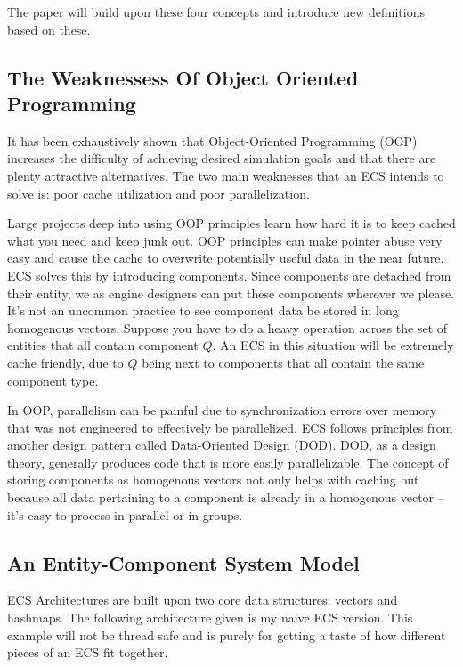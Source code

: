 \noindent The paper will build upon these four concepts and introduce new definitions based on these.

\subsection{The Weaknessess Of Object Oriented Programming}

It has been exhaustively shown that Object-Oriented Programming (OOP) increases the difficulty of achieving desired simulation goals and that there are plenty attractive alternatives. The two main weaknesses that an ECS intends to solve is: poor cache utilization and poor parallelization.

Large projects deep into using OOP principles learn how hard it is to keep cached what you need and keep junk out. OOP principles can make pointer abuse very easy and cause the cache to overwrite potentially useful data in the near future. ECS solves this by introducing components. Since components are detached from their entity, we as engine designers can put these components wherever we please. It's not an uncommon practice to see component data be stored in long homogenous vectors. Suppose you have to do a heavy operation across the set of entities that all contain component $Q$. An ECS in this situation will be extremely cache friendly, due to $Q$ being next to components that all contain the same component type.

In OOP, parallelism can be painful due to synchronization errors over memory that was not engineered to effectively be parallelized. ECS follows principles from another design pattern called Data-Oriented Design (DOD). DOD, as a design theory, generally produces code that is more easily parallelizable. The concept of storing components as homogenous vectors not only helps with caching but because all data pertaining to a component is already in a homogenous vector -- it's easy to process in parallel or in groups.

\subsection{An Entity-Component System Model}

ECS Architectures are built upon two core data structures: vectors and hashmaps. The following architecture given is my naive ECS version. This example will not be thread safe and is purely for getting a taste of how different pieces of an ECS fit together.


